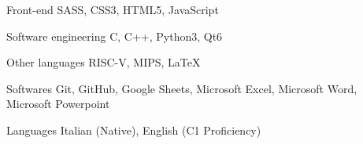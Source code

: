 

\begin{cvskills}

  \cvskill
    {Front-end} %
    {SASS, CSS3, HTML5, JavaScript} %

  \cvskill
    {Software engineering} %
    {C, C++, Python3, Qt6} %

  \cvskill
    {Other languages} %
    {RISC-V, MIPS, LaTeX} %

  \cvskill
    {Softwares} %
    {Git, GitHub, Google Sheets, Microsoft Excel, Microsoft Word, Microsoft Powerpoint} %

  \cvskill
    {Languages} %
    {Italian (Native), English (C1 Proficiency)} %

\end{cvskills}
